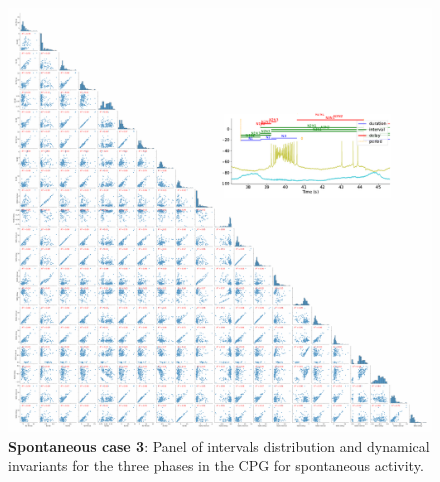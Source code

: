 \begin{figure}[htbp]
	\centering
	\includegraphics[width=\textwidth]{./invariants/data/SUSSEX/prep1/images/3phases/panel_with_pairplot.pdf}
	\caption{\textbf{Spontaneous case 3}: Panel of intervals distribution and dynamical invariants for the three phases in the CPG for spontaneous activity.}
	\label{fig:prep1 invariants pairplot}
\end{figure}

%



